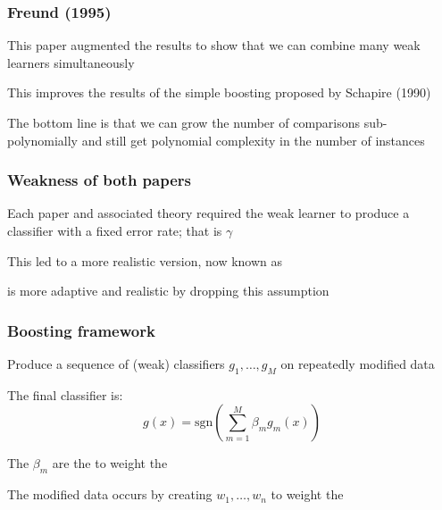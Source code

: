 \documentclass[12pt]{beamer}
\begin{document}
\begin{frame}[fragile]
\frametitle{Freund (1995)}
This paper augmented the results to show that we can combine many weak learners simultaneously

\vsp
This improves the results of the simple boosting proposed by Schapire (1990)

\vsp
The bottom line is that we can grow the number of comparisons sub-polynomially and still get polynomial complexity
in the number of instances
\end{frame}

\begin{frame}[fragile]
\frametitle{Weakness of both papers}
Each paper and associated theory required the weak learner to produce a classifier with
a fixed error rate; that is $\gamma$

\vsp
This led to a more realistic version, now known as 

\vsp
{} is more adaptive and realistic by dropping this assumption
\end{frame}

%
%
%
%
%
%

\begin{frame}[fragile]
\frametitle{Boosting framework}
 Produce a sequence of (weak) classifiers $g_1,\ldots,g_M$  on repeatedly modified data

\vsp
The final classifier is:
\[
g(x) = \textrm{sgn}\left(\sum_{m=1}^M \beta_m g_m(x)\right)
\]

\vsp
The $\beta_m$ are the  to weight the 

\vsp
The modified data occurs by creating  $w_1,\ldots,w_n$ to weight the 


\end{frame}
\end{document}
